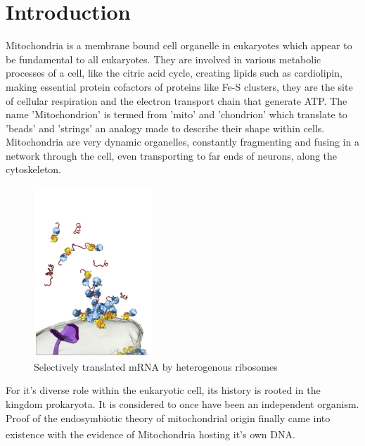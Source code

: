 
\chapter{Introduction}

Mitochondria is a membrane bound cell organelle in eukaryotes which appear to be fundamental to all eukaryotes.  They are involved in various metabolic processes of a cell, like the citric acid cycle, creating lipids such as cardiolipin, making essential protein cofactors of proteins like Fe-S clusters, they are the site of cellular respiration and the electron transport chain that generate ATP. The name 'Mitochondrion' is termed from 'mito' and 'chondrion' which translate to 'beads' and 'strings' an analogy made to describe their shape within cells. Mitochondria are very dynamic organelles, constantly fragmenting and fusing in a network through the cell, even transporting to far ends of neurons, along the cytoskeleton. 
\\
\begin{figure}
  \begin{center}
    \includegraphics[width=0.4\textwidth]{Mitotransimport}
  \end{center}
  \caption{Selectively translated mRNA by heterogenous ribosomes}
  \label{selectivelytranslatedmrna}
\end{figure}

For it’s diverse role within the eukaryotic cell, its history is rooted in the kingdom prokaryota. It is considered to once have been an independent organism. Proof of the endosymbiotic theory of mitochondrial origin finally came into existence with the evidence of Mitochondria hosting it’s own DNA\textsuperscript{\cite{Gerst}}.
\vspace{3cm}



